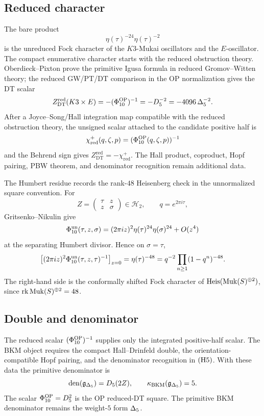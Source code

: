 \subsection*{Reduced character}

The bare product
\[
  \eta(\tau)^{-24}\eta(\tau)^{-2}
\]
is the unreduced Fock character of the \(K3\)-Mukai oscillators and the
\(E\)-oscillator.  The compact enumerative character starts with the
reduced obstruction theory.
Oberdieck--Pixton prove the primitive Igusa formula in reduced
Gromov--Witten theory; the reduced GW/PT/DT comparison in the OP
normalization gives the DT scalar
\[
  Z_{\mathrm{DT}}^{\mathrm{red}}(K3\times E)
  =
  -(\Phi_{10}^{\mathrm{OP}})^{-1}
  =
  -D_{5}^{-2}
  =
  -4096\,\Delta_{5}^{-2}.
\]
After a Joyce--Song/Hall integration map compatible with the reduced
obstruction theory, the unsigned scalar attached to the candidate
positive half is
\[
  \chi_{\mathrm{red}}^{+}(q,\zeta,p)=(\Phi_{10}^{\mathrm{OP}}(q,\zeta,p))^{-1}
\]
and the Behrend sign gives \(Z_{\mathrm{DT}}^{\mathrm{red}}=-\chi_{\mathrm{red}}^{+}\).
The Hall product, coproduct, Hopf pairing, PBW theorem, and denominator
recognition remain additional data.

The Humbert residue records the rank-\(48\) Heisenberg check in the
unnormalized square convention.  For
\[
  Z=\begin{pmatrix}\tau&z\\ z&\sigma\end{pmatrix}\in\mathcal H_2,
  \qquad
  q=e^{2\pi i\tau},
\]
Gritsenko--Nikulin give
\[
  \Phi_{10}^{\mathrm{un}}(\tau,z,\sigma)
  =
  (2\pi iz)^2\eta(\tau)^{24}\eta(\sigma)^{24}+O(z^4)
\]
at the separating Humbert divisor.  Hence on \(\sigma=\tau\),
\[
  \left[(2\pi iz)^2\Phi_{10}^{\mathrm{un}}(\tau,z,\tau)^{-1}\right]_{z=0}
  =
  \eta(\tau)^{-48}
  =
  q^{-2}\prod_{n\geq 1}(1-q^n)^{-48}.
\]
The right-hand side is the conformally shifted Fock character of
\(\mathrm{Heis}(\mathrm{Muk}(S)^{\oplus 2})\), since
\(\operatorname{rk}\mathrm{Muk}(S)^{\oplus 2}=48\).

\subsection*{Double and denominator}

The reduced scalar \((\Phi_{10}^{\mathrm{OP}})^{-1}\) supplies only the integrated
positive-half scalar.  The BKM object requires the compact
Hall--Drinfeld double, the orientation-compatible Hopf pairing, and the
denominator recognition in \(\textup{(H5)}\).  With these data the
primitive denominator is
\[
  \operatorname{den}(\mathfrak g_{\Delta_{5}})=D_{5}(2Z),
  \qquad
  \kappa_{\mathrm{BKM}}(\mathfrak g_{\Delta_{5}})=5.
\]
The scalar \(\Phi_{10}^{\mathrm{OP}}=D_{5}^2\) is the OP reduced-DT square.  The
primitive BKM denominator remains the weight-\(5\) form \(\Delta_{5}\).

